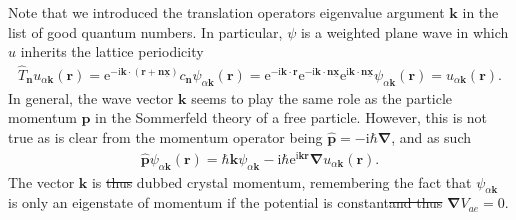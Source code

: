 \documentclass{svmono}
\def\ri{\mathrm i}
\def\re{\mathrm e}
\newcommand{\brlr}[1]{\left( #1 \right)}
\providecommand{\DIFaddtex}[1]{{\protect\color{blue}\uwave{#1}}} %
\providecommand{\DIFdeltex}[1]{{\protect\color{red}\sout{#1}}}                      %
\providecommand{\DIFaddbegin}{} %
\providecommand{\DIFaddend}{} %
\providecommand{\DIFdelbegin}{} %
\providecommand{\DIFdelend}{} %
\providecommand{\DIFadd}[1]{\texorpdfstring{\DIFaddtex{#1}}{#1}} %
\providecommand{\DIFdel}[1]{\texorpdfstring{\DIFdeltex{#1}}{}} %
\newcommand{\DIFscaledelfig}{0.5}
\newlength{\DIFdelgraphicswidth} %
\newlength{\DIFdelgraphicsheight} %
\newcommand{\DIFaddincludegraphics}[2][]{{\color{blue}\fbox{\DIFOincludegraphics[#1]{#2}}}} %
\newcommand{\DIFdelincludegraphics}[2][]{%
\sbox{\DIFdelgraphicsbox}{\DIFOincludegraphics[#1]{#2}}%
\settoboxwidth{\DIFdelgraphicswidth}{\DIFdelgraphicsbox} %
\settoboxtotalheight{\DIFdelgraphicsheight}{\DIFdelgraphicsbox} %
\scalebox{\DIFscaledelfig}{%
\parbox[b]{\DIFdelgraphicswidth}{\usebox{\DIFdelgraphicsbox}\\[-\baselineskip] \rule{\DIFdelgraphicswidth}{0em}}\llap{\resizebox{\DIFdelgraphicswidth}{\DIFdelgraphicsheight}{%
\setlength{\unitlength}{\DIFdelgraphicswidth}%
\begin{picture}(1,1)%
\thicklines\linethickness{2pt} %
{\color[rgb]{1,0,0}\put(0,0){\framebox(1,1){}}}%
{\color[rgb]{1,0,0}\put(0,0){\line( 1,1){1}}}%
{\color[rgb]{1,0,0}\put(0,1){\line(1,-1){1}}}%
\end{picture}%
}\hspace*{3pt}}} %
} %
\DeclareRobustCommand{\DIFaddbegin}{\DIFOaddbegin \let\includegraphics\DIFaddincludegraphics} %
\DeclareRobustCommand{\DIFaddend}{\DIFOaddend \let\includegraphics\DIFOincludegraphics} %
\DeclareRobustCommand{\DIFdelbegin}{\DIFOdelbegin \let\includegraphics\DIFdelincludegraphics} %
\DeclareRobustCommand{\DIFdelend}{\DIFOaddend \let\includegraphics\DIFOincludegraphics} %
\begin{document}
Note that we introduced the translation operators eigenvalue argument $\bm k$ in the list of good quantum numbers.
In particular, $\psi$ is a weighted plane wave in which $u$ inherits the lattice periodicity
\begin{align}
    \hat T_{\bm n} u_{\alpha{\bm k}}({\bm r})
    =
    \re^{-\ri{\bm k}\cdot \brlr{{\bm r}+{\bm n}\underline{\bm x}}}c_{\bm n}\psi_{\alpha{\bm k}}({\bm r})
    =
    \re^{-\ri{\bm k}\cdot {\bm r}}\re^{-\ri{\bm k}\cdot {\bm n}\underline{\bm x}}\re^{\ri{\bm k}\cdot {\bm n}\underline{\bm x}}\psi_{\alpha{\bm k}}({\bm r})
    =
    u_{\alpha{\bm k}}({\bm r}).
\end{align}
In general, the wave vector $\bm k$ seems to play the same role as the particle momentum $\bm p$ in the Sommerfeld theory of a free particle.
However, this is not true as is clear from the momentum operator being $\hat{\bm p}=-\ri\hbar\bm \nabla$, and as such
\begin{align}
  \hat{\bm p}\psi_{\alpha{\bm k}}({\bm r}) = \hbar{\bm k}\psi_{\alpha{\bm k}} - \ri\hbar\re^{\ri{\bm k}{\bm r}}\bm\nabla u_{\alpha \bm k}(\bm r).
\end{align}
The vector ${\bm k}$ is \DIFdelbegin \DIFdel{thus }\DIFdelend dubbed crystal momentum, remembering the fact that $\psi_{\alpha{\bm k}}$ is only an eigenstate of momentum if the potential is constant\DIFdelbegin \DIFdel{and thus }\DIFdelend \DIFaddbegin \DIFadd{, i.e. }\DIFaddend $\bm\nabla V_{ae}=0$.
\end{document}
